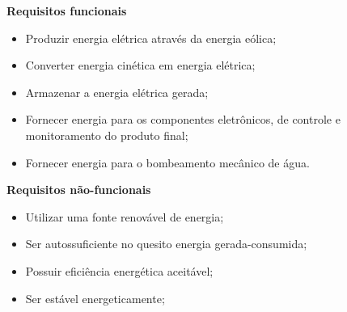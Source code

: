 \begin{itemize}
	 \textbf{Requisitos funcionais}
	  \begin{itemize}
	   \item Produzir energia elétrica através da energia eólica;
	   \item Converter energia cinética em energia elétrica;
	   \item Armazenar a energia elétrica gerada;
	   \item Fornecer energia para os componentes eletrônicos, de controle e monitoramento do produto final;
	   \item Fornecer energia para o bombeamento mecânico de água.
	  \end{itemize}
	  
	  \textbf{Requisitos não-funcionais}
	  \begin{itemize}
	   \item Utilizar uma fonte renovável de energia;
	   \item Ser autossuficiente no quesito energia gerada-consumida;
	   \item Possuir eficiência energética aceitável;
	   \item Ser estável energeticamente;
	  \end{itemize}
	  
      \end{itemize}
    
    
    
    